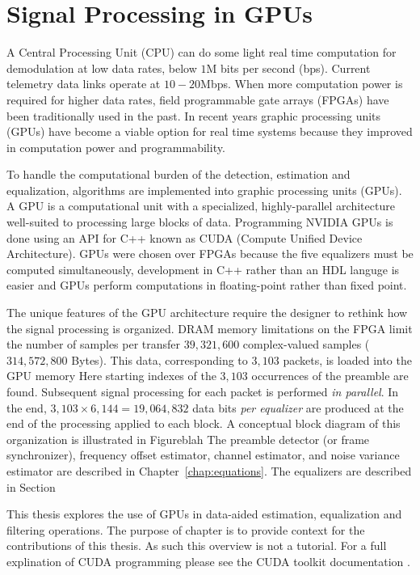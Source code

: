  \chapter{Signal Processing in GPUs}
\label{chap:gpu}


A Central Processing Unit (CPU) can do some light real time computation for demodulation at low data rates, below $1$M bits per second (bps).
Current telemetry data links operate at $10-20$Mbps.
When more computation power is required for higher data rates,
field programmable gate arrays (FPGAs) have been traditionally used in the past.
In recent years graphic processing units (GPUs) have become a viable option for real time systems because they improved in computation power and programmability.


To handle the computational burden of the detection, estimation and equalization, algorithms are implemented into graphic processing units (GPUs).
A GPU is a computational unit with a specialized, highly-parallel architecture well-suited to processing large blocks of data.
Programming NVIDIA GPUs is done using an API for C++ known as CUDA (Compute Unified Device Architecture).
GPUs were chosen over FPGAs because the five equalizers must be computed simultaneously, development in C++ rather than an HDL languge is easier and GPUs perform computations in floating-point rather than fixed point.

The unique features of the GPU architecture require the designer to rethink how the
signal processing is organized.
DRAM memory limitations on the FPGA limit the number of samples per transfer $39{,}321{,}600$
complex-valued samples ($314{,}572{,}800$ Bytes).
This data, corresponding to $3{,}103$ packets,
is loaded into the GPU memory
Here starting indexes of the $3{,}103$ occurrences of the preamble are found.
Subsequent signal processing for each packet is performed \textit{in parallel}.
In the end, $3{,}103 \times 6{,}144 = 19{,}064{,}832$ data bits \textit{per equalizer}
are produced at the end of the processing applied to each block.
A conceptual block diagram of this organization is illustrated in Figureblah 
The preamble detector (or frame synchronizer), frequency offset estimator, channel estimator, and
noise variance estimator are described in Chapter~\ref{chap:equations}.
The equalizers are described in Section

This thesis explores the use of GPUs in data-aided estimation, equalization and filtering operations.
The purpose of chapter is to provide context for the contributions of this thesis.
As such this overview is not a tutorial.
For a full explination of CUDA programming please see the CUDA toolkit documentation \cite{CUDA_toolkit_doc}.

